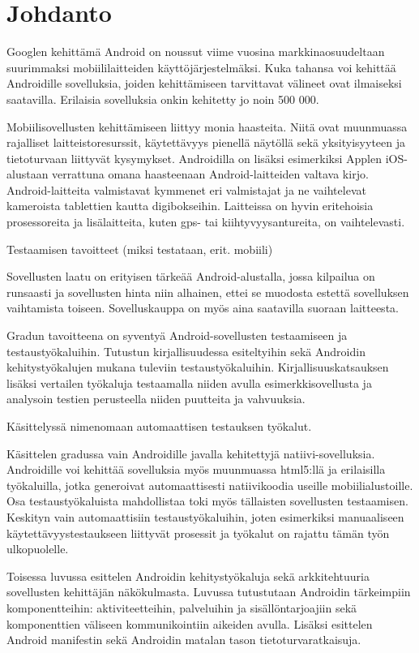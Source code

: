 \section{Johdanto}

Googlen kehittämä Android on noussut viime vuosina markkinaosuudeltaan suurimmaksi mobiililaitteiden käyttöjärjestelmäksi. Kuka tahansa voi kehittää Androidille sovelluksia, joiden kehittämiseen tarvittavat välineet ovat ilmaiseksi saatavilla. Erilaisia sovelluksia onkin kehitetty jo noin 500 000.

Mobiilisovellusten kehittämiseen liittyy monia haasteita. Niitä ovat muunmuassa rajalliset laitteistoresurssit, käytettävyys pienellä näytöllä sekä yksityisyyteen ja tietoturvaan liittyvät kysymykset. Androidilla on lisäksi esimerkiksi Applen iOS-alustaan verrattuna omana haasteenaan Android-laitteiden valtava kirjo. Android-laitteita valmistavat kymmenet eri valmistajat ja ne vaihtelevat kameroista tablettien kautta digibokseihin. Laitteissa on hyvin eritehoisia prosessoreita ja lisälaitteita, kuten gps- tai kiihtyvyysantureita, on vaihtelevasti.

Testaamisen tavoitteet (miksi testataan, erit. mobiili)

Sovellusten laatu on erityisen tärkeää Android-alustalla, jossa kilpailua on runsaasti ja sovellusten hinta niin alhainen, ettei se muodosta estettä sovelluksen vaihtamista toiseen. Sovelluskauppa on myös aina saatavilla suoraan laitteesta.

Gradun tavoitteena on syventyä Android-sovellusten testaamiseen ja testaustyökaluihin. Tutustun kirjallisuudessa esiteltyihin sekä Androidin kehitystyökalujen mukana tuleviin testaustyökaluihin. Kirjallisuuskatsauksen lisäksi vertailen työkaluja testaamalla niiden avulla esimerkkisovellusta ja analysoin testien perusteella niiden puutteita ja vahvuuksia.

Käsittelyssä nimenomaan automaattisen testauksen työkalut.

Käsittelen gradussa vain Androidille javalla kehitettyjä natiivi-sovelluksia. Androidille voi kehittää sovelluksia myös muunmuassa html5:llä ja erilaisilla työkaluilla, jotka generoivat automaattisesti natiivikoodia useille mobiilialustoille. Osa testaustyökaluista mahdollistaa toki myös tällaisten sovellusten testaamisen. Keskityn vain automaattisiin testaustyökaluihin, joten esimerkiksi manuaaliseen käytettävyystestaukseen liittyvät prosessit ja työkalut on rajattu tämän työn ulkopuolelle.

Toisessa luvussa esittelen Androidin kehitystyökaluja sekä arkkitehtuuria sovellusten kehittäjän näkökulmasta. Luvussa tutustutaan Androidin tärkeimpiin komponentteihin: aktiviteetteihin, palveluihin ja sisällöntarjoajiin sekä komponenttien väliseen kommunikointiin aikeiden avulla. Lisäksi esittelen Android manifestin sekä Androidin matalan tason tietoturvaratkaisuja.

